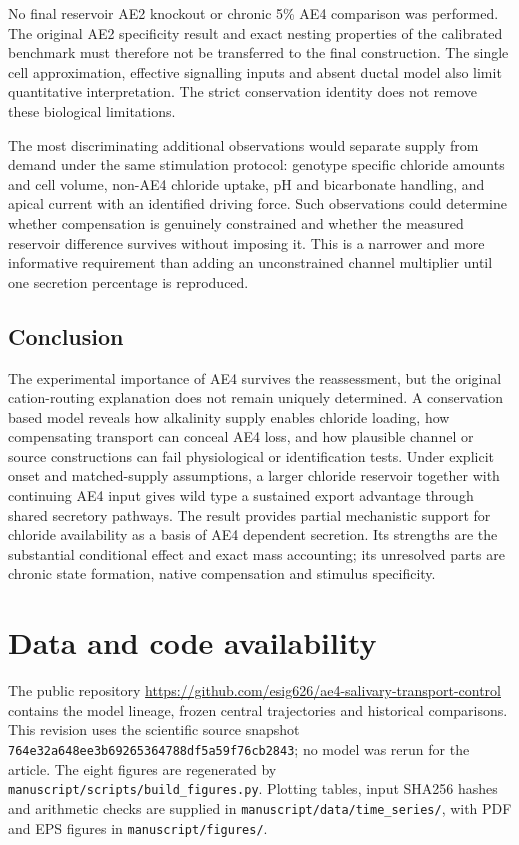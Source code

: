 \documentclass[11pt]{article}
\begin{document}
No final reservoir AE2 knockout or chronic 5\% AE4 comparison was performed. The original AE2 specificity result and exact nesting properties of the calibrated benchmark must therefore not be transferred to the final construction. The single cell approximation, effective signalling inputs and absent ductal model also limit quantitative interpretation. The strict conservation identity does not remove these biological limitations.

The most discriminating additional observations would separate supply from demand under the same stimulation protocol: genotype specific chloride amounts and cell volume, non-AE4 chloride uptake, pH and bicarbonate handling, and apical current with an identified driving force. Such observations could determine whether compensation is genuinely constrained and whether the measured reservoir difference survives without imposing it. This is a narrower and more informative requirement than adding an unconstrained channel multiplier until one secretion percentage is reproduced.

\subsection{Conclusion}

The experimental importance of AE4 survives the reassessment, but the original cation-routing explanation does not remain uniquely determined. A conservation based model reveals how alkalinity supply enables chloride loading, how compensating transport can conceal AE4 loss, and how plausible channel or source constructions can fail physiological or identification tests. Under explicit onset and matched-supply assumptions, a larger chloride reservoir together with continuing AE4 input gives wild type a sustained export advantage through shared secretory pathways. The result provides partial mechanistic support for chloride availability as a basis of AE4 dependent secretion. Its strengths are the substantial conditional effect and exact mass accounting; its unresolved parts are chronic state formation, native compensation and stimulus specificity.


\section*{Data and code availability}
The public repository \url{https://github.com/esig626/ae4-salivary-transport-control} contains the model lineage, frozen central trajectories and historical comparisons. This revision uses the scientific source snapshot \nolinkurl{764e32a648ee3b69265364788df5a59f76cb2843}; no model was rerun for the article. The eight figures are regenerated by \nolinkurl{manuscript/scripts/build_figures.py}. Plotting tables, input SHA256 hashes and arithmetic checks are supplied in \nolinkurl{manuscript/data/time_series/}, with PDF and EPS figures in \nolinkurl{manuscript/figures/}.
\end{document}
